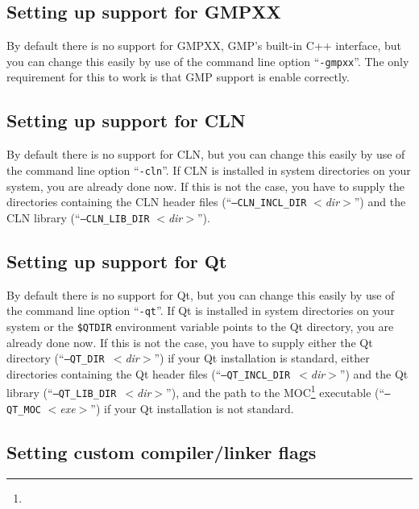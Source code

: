 \subsection{Setting up support for GMPXX}\label{sec:gmpxx-setup}

By default there is no support for GMPXX, GMP's built-in C++ interface, but
you can change this easily by use of the command line option
``\texttt{-gmpxx}''.  The only requirement for this to work is that GMP
support is enable correctly.

\subsection{Setting up support for CLN}\label{sec:cln-setup}

By default there is no support for CLN, but you can change this easily
by use of the command line option ``\texttt{-cln}''. If CLN is
installed in system directories on your system, you are already done
now. If this is not the case, you have to supply the directories
containing the CLN header files (``\texttt{--CLN\_INCL\_DIR}
\textit{$<$dir$>$}'') and the CLN library
(``\texttt{--CLN\_LIB\_DIR}
\textit{$<$dir$>$}'').

\subsection{Setting up support for Qt}\label{sec:qt-setup}

By default there is no support for Qt, but you can change this easily
by use of the command line option ``\texttt{-qt}''. If Qt is installed
in system directories on your system or the \texttt{\$QTDIR}
environment variable points to the Qt directory, you are already done
now. If this is not the case, you have to supply either the Qt
directory (``\texttt{--QT\_DIR}~\textit{$<$dir$>$}'')
if your Qt installation is standard, either directories containing the
Qt header files
(``\texttt{--QT\_INCL\_DIR}~\textit{$<$dir$>$}'')
and the Qt library
(``\texttt{--QT\_LIB\_DIR}~\textit{$<$dir$>$}''),
and the path to the MOC\footnote{\qtmocpage} executable
(``\texttt{--QT\_MOC} \textit{$<$exe$>$}'') if your
Qt installation is not standard.

\subsection{Setting custom compiler/linker flags}\label{sec:custom-setup}


